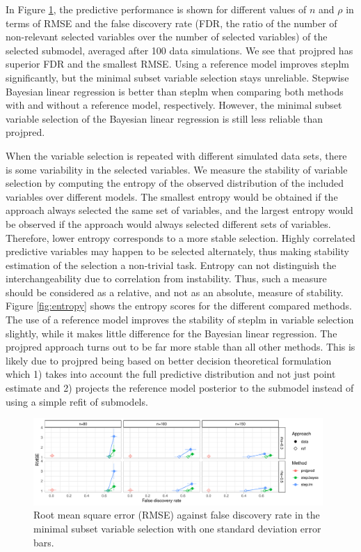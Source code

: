 \documentclass[a4]{article}
\theoremstyle{definition}
\begin{document}
In Figure \ref{fig:rmse_vs_fdr}, the predictive performance is shown
for different values of $n$ and $\rho$ in terms of RMSE and the false discovery rate (FDR, the ratio of the number of non-relevant selected
variables over the number of selected variables) of the selected submodel,
averaged after 100 data simulations. We see that projpred has superior FDR and the
smallest RMSE. Using a reference model improves steplm significantly,
but the minimal subset variable selection stays unreliable. Stepwise
Bayesian linear regression is better than steplm when comparing both methods with
and without a reference model, respectively. However, the minimal subset variable
selection of the Bayesian linear regression is still less reliable than projpred.

When the variable selection is repeated with different simulated data
sets, there is some variability in the selected variables. We
measure the stability of variable selection by computing the entropy
of the observed distribution of the included variables over different models. The smallest entropy
would be obtained if the approach always selected the same set of
variables, and the largest entropy would be observed if the approach
would always selected different sets of variables. Therefore, lower entropy 
corresponds to a more stable selection. Highly correlated predictive variables may happen to be
selected alternately, thus making stability estimation of the
selection a non-trivial task. Entropy can not distinguish the interchangeability 
due to correlation from instability. Thus, such a measure should be 
considered as a relative, and not as an absolute, measure of stability.
Figure \ref{fig:entropy} shows the entropy scores for the different compared
methods. The use of a reference model
improves the stability of steplm in variable selection slightly, while it makes
little difference for the Bayesian linear regression. The
projpred approach turns out to be far more stable than all
other methods. This is likely due to projpred being based on better
decision theoretical formulation which 1) takes into account the full
predictive distribution and not just point estimate and 2) projects
the reference model posterior to the submodel instead of using a
simple refit of submodels.

\begin{figure}[tp]
  \centering
  \includegraphics[width=0.98\textwidth]{graphics/rmse_vs_fdr_parallel.pdf}
  \caption{Root mean square error (RMSE) against false discovery rate in the minimal subset variable selection with one standard deviation error bars.}
  \label{fig:rmse_vs_fdr}
\end{figure}
\end{document}
